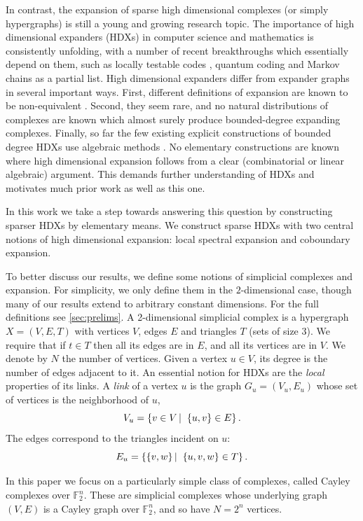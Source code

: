\documentclass[10pt,a4paper]{article}
\newcommand{\prettyref}[1]{\cref{#1}}
\theoremstyle{definition}
\theoremstyle{remark}
\newcommand\sett[2]{\left\{ #1 \left| \; \vphantom{#1 #2} \right. #2  \right\}}
\newcommand{\set}[1]{\{#1\}}
\newcommand{\F}{\mathbb{F}}
\numberwithin{equation}{section}
\let\pref=\prettyref
\begin{document}
In contrast, the expansion of sparse high dimensional complexes (or simply hypergraphs) is still a young and growing research topic. The importance of high dimensional expanders (HDXs) in computer science and mathematics is consistently unfolding, with a number of recent breakthroughs which essentially depend on them, such as locally testable codes \cite{dinur2022good,PanteleevK22}, quantum coding \cite{anshu2023nlts} and Markov chains \cite{AnariLOV2019} as a partial list. High dimensional expanders differ from expander graphs in several important ways. First, different definitions of expansion are known to be non-equivalent \cite{GundertW2016}. Second, they seem rare, and no natural distributions of complexes are known which almost surely produce bounded-degree expanding complexes. Finally, so far the few existing explicit constructions of bounded degree HDXs use algebraic methods \cite{Ballantine2000,CartwrightSZ2003,Li2004,LubotzkySV2005,KaufmanO2021,ODonnellP2022,Dikstein2023}. No elementary constructions
are known where high dimensional expansion follows from a clear (combinatorial or linear algebraic) argument. This demands further understanding of HDXs and motivates much prior work as well as this one.

In this work we take a step towards answering this question by constructing sparser HDXs by elementary means. We construct sparse HDXs with two central notions of high dimensional expansion: local spectral expansion and coboundary expansion.

To better discuss our results, we define some notions of simplicial complexes and expansion. For simplicity, we only define them in the \(2\)-dimensional case, though many of our results extend to arbitrary constant dimensions. For the full definitions see \pref{sec:prelims}. A 2-dimensional simplicial complex is a hypergraph \(X=(V,E,T)\) with vertices \(V\), edges \(E\) and triangles \(T\) (sets of size \(3\)). We require that if \(t \in T\) then all its edges are in \(E\), and all its vertices are in \(V\). We denote by \(N\) the number of vertices. Given a vertex \(u \in V\), its degree is the number of edges adjacent to it.  An essential notion for HDXs are the \emph{local} properties of its links. A \emph{link} of a vertex \(u\) is the graph \(G_u=(V_u,E_u)\) whose set of vertices is the neighborhood of \(u\), 
\[V_u = \sett{v \in V}{\set{u,v} \in E}.\]
The edges correspond to the triangles incident on \(u\):
\[E_u = \sett{\set{v,w}}{\set{u,v,w} \in T}.\]

In this paper we focus on a particularly simple class of complexes, called Cayley complexes over \(\F_2^n\). These are simplicial complexes whose underlying graph \((V,E)\) is a Cayley graph over \(\mathbb{F}_2^n\), and so have \(N=2^n\) vertices. 
\end{document}
